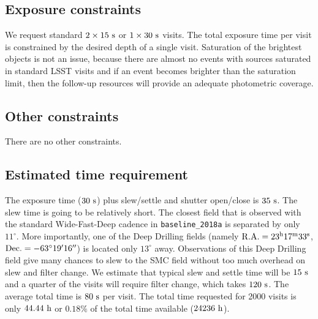 \documentclass[12pt,letterpaper]{article}
\begin{document}
\subsection{Exposure constraints}

We request standard $2\times15~{\rm s}$ or $1\times30~{\rm s}$ visits.  
The total exposure time per visit is constrained by the desired depth of a single visit.  
Saturation of the brightest objects is not an issue, because there are almost 
no events with sources saturated in standard LSST visits and if an event 
becomes brighter than the saturation limit, then the follow-up resources 
will provide an adequate photometric coverage.


\subsection{Other constraints}

There are no other constraints.


\subsection{Estimated time requirement}

The exposure time ($30~{\rm s}$) plus slew/settle and shutter open/close is  
$35~{\rm s}$.  The slew time is going to be relatively short.  The closest field 
that is observed with the standard Wide-Fast-Deep cadence in {\tt baseline\_2018a} 
is separated by only $11^{\circ}$.  
More importantly, one of the Deep Drilling fields (namely 
${\rm R.A.} = 23^{\rm h}17^{\rm m}33^{\rm s}$, 
${\rm Dec.} = -63^{\circ}19'16''$) is located only $13^{\circ}$ away.  
Observations of this Deep Drilling field give many chances to slew to 
the SMC field without too much overhead on slew and filter change.  
We estimate that typical slew and settle time will be $15~{\rm s}$ 
and a quarter of the visits will require filter change, which takes $120~{\rm s}$.  
The average total time is $80~{\rm s}$ per visit.  
The total time requested for 2000 visits is only $44.44~{\rm h}$ or 
$0.18\%$ of the total time available ($24236~{\rm h}$).  
\end{document}
